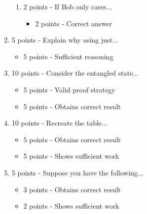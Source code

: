 \documentclass[12pt]{article}
\begin{document}
\begin{enumerate}[font=\bfseries]
\begin{enumerate}
            \item 2 points - If Bob only cares...
            \begin{itemize}
                \item 2 points - Correct answer
            \end{itemize}
        \end{enumerate}
    \item 5 points - Explain why using just...
        \begin{itemize}
            \item 5 points - Sufficient reasoning
        \end{itemize}
    \item 10 points - Consider the entangled state...
        \begin{itemize}
            \item 5 points - Valid proof strategy
            \item 5 points - Obtains correct result
        \end{itemize}
    \item 10 points - Recreate the table...
        \begin{itemize}
            \item 5 points - Obtains correct result
            \item 5 points - Shows sufficient work
        \end{itemize}
    \item 5 points - Suppose you have the following...
        \begin{itemize}
            \item 3 points - Obtains correct result
            \item 2 points - Shows sufficient work
        \end{itemize}
\end{enumerate}
\end{document}

